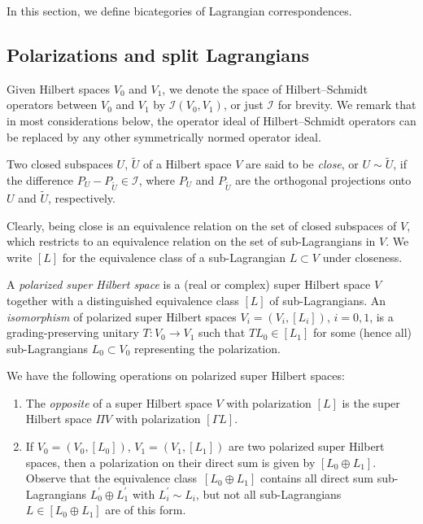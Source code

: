 \documentclass[10pt,a4paper]{amsart}
\numberwithin{equation}{section}
\begin{document}
In this section, we define bicategories of Lagrangian correspondences.

\subsection{Polarizations and split Lagrangians}\label{SectionPolarizations}

Given Hilbert spaces $V_0$ and $V_1$, we denote the space of Hilbert--Schmidt operators between $V_0$ and $V_1$ by $\mathcal{I}(V_0, V_1)$, or just $\mathcal{I}$ for brevity.
We remark that in most considerations below, the operator ideal of Hilbert--Schmidt operators can be replaced by any other symmetrically normed operator ideal.

\begin{Definition}
Two closed subspaces $U$, $\tilde{U}$ of a Hilbert space $V$ are said to be {\em close}, or $U \sim \tilde{U}$, if the difference $P_{U} - P_{\tilde{U}} \in \mathcal{I}$, where $P_{U}$ and $P_{\tilde{U}}$ are the orthogonal projections onto $U$ and $\tilde{U}$, respectively.
\end{Definition}

Clearly, being close is an equivalence relation on the set of closed subspaces of $V$, which restricts to an equivalence relation on the set of sub-Lagrangians in $V$.
We write $[L]$ for the equivalence class of a sub-Lagrangian $L \subset V$ under closeness.

\begin{Definition}
A {\em polarized super Hilbert space} is a (real or complex) super Hilbert space $V$ together with a distinguished equivalence class $[L]$ of sub-Lagrangians.
An {\em isomorphism} of polarized super Hilbert spaces $V_i = (V_i, [L_i])$, $i=0, 1$, is a grading-preserving unitary $T\colon V_0 \to V_1$ such that $TL_0 \in [L_1]$ for some (hence all) sub-Lagrangians $L_0 \subset V_0$ representing the polarization.
\end{Definition}


\begin{Example} \label{ExamplePolarizedHilbertSpace}
We have the following operations on polarized super Hilbert spaces:
\begin{enumerate}\itemsep=0pt
\item[(a)] The {\em opposite} of a super Hilbert space $V$ with polarization $[L]$ is the super Hilbert space $\Pi V$ with polarization $[\Gamma L]$.
\item[(b)] If $V_0 = (V_0, [L_0])$, $V_1 = (V_1, [L_1])$ are two polarized super Hilbert spaces, then a polarization on their direct sum is given by $[L_0 \oplus L_1]$.
Observe that the equivalence class~${[L_0 \oplus L_1]}$ contains all direct sum sub-Lagrangians $L_0^\prime \oplus L_1^\prime$ with $L_i^\prime \sim L_i$, but not all sub-Lagrangians ${L \in [L_0 \oplus L_1]}$ are of this form.
\end{enumerate}
\end{Example}
\end{document}
